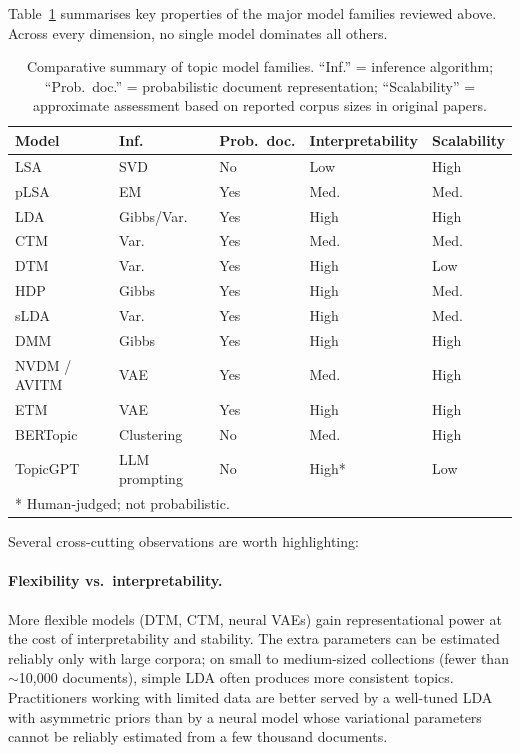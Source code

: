 \documentclass[11pt,a4paper]{article}
\begin{document}
Table~\ref{tab:model-comparison} summarises key properties of the
major model families reviewed above.
Across every dimension, no single model dominates all others.

\begin{table}[ht]
\centering
\caption{Comparative summary of topic model families. ``Inf.'' =
  inference algorithm; ``Prob.\ doc.'' = probabilistic document
  representation; ``Scalability'' = approximate assessment based on
  reported corpus sizes in original papers.}
\label{tab:model-comparison}
\small
\begin{tabular}{@{}lllll@{}}
\toprule
Model & Inf. & Prob.\ doc. & Interpretability & Scalability \\
\midrule
LSA                        & SVD              & No  & Low   & High \\
pLSA                       & EM               & Yes & Med.  & Med. \\
LDA                        & Gibbs/Var.       & Yes & High  & High \\
CTM                        & Var.             & Yes & Med.  & Med. \\
DTM                        & Var.             & Yes & High  & Low  \\
HDP                        & Gibbs            & Yes & High  & Med. \\
sLDA                       & Var.             & Yes & High  & Med. \\
DMM                        & Gibbs            & Yes & High  & High \\
NVDM / AVITM               & VAE              & Yes & Med.  & High \\
ETM                        & VAE              & Yes & High  & High \\
BERTopic                   & Clustering       & No  & Med.  & High \\
TopicGPT                   & LLM prompting    & No  & High* & Low  \\
\bottomrule
\multicolumn{5}{l}{* Human-judged; not probabilistic.}
\end{tabular}
\end{table}

Several cross-cutting observations are worth highlighting:

\paragraph{Flexibility vs.\ interpretability.}
More flexible models (DTM, CTM, neural VAEs) gain representational
power at the cost of interpretability and stability.
The extra parameters can be estimated reliably only with large corpora;
on small to medium-sized collections (fewer than $\sim$10,000
documents), simple LDA often produces more consistent topics.
Practitioners working with limited data are better served by a
well-tuned LDA with asymmetric priors than by a neural model whose
variational parameters cannot be reliably estimated from a few thousand
documents.
\end{document}
